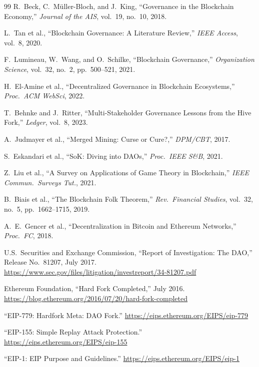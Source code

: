 \documentclass[sigconf,nonacm]{acmart}
\begin{document}
{\begin{thebibliography}{99}
R.~Beck, C.~Müller-Bloch, and J.~King, ``Governance in the Blockchain Economy,''
\emph{Journal of the AIS}, vol.~19, no.~10, 2018.

L.~Tan et al., ``Blockchain Governance: A Literature Review,'' \emph{IEEE Access},
vol.~8, 2020.

F.~Lumineau, W.~Wang, and O.~Schilke, ``Blockchain Governance,''
\emph{Organization Science}, vol.~32, no.~2, pp.~500--521, 2021.

H.~El-Amine et al., ``Decentralized Governance in Blockchain Ecosystems,''
\emph{Proc.\ ACM WebSci}, 2022.

T.~Behnke and J.~Ritter, ``Multi-Stakeholder Governance Lessons from the Hive Fork,''
\emph{Ledger}, vol.~8, 2023.

A.~Judmayer et al., ``Merged Mining: Curse or Cure?,'' \emph{DPM/CBT}, 2017.

S.~Eskandari et al., ``SoK: Diving into DAOs,'' \emph{Proc.\ IEEE S\&B}, 2021.

Z.~Liu et al., ``A Survey on Applications of Game Theory in Blockchain,''
\emph{IEEE Commun.\ Surveys Tut.}, 2021.

B.~Biais et al., ``The Blockchain Folk Theorem,'' \emph{Rev.\ Financial Studies},
vol.~32, no.~5, pp.~1662--1715, 2019.

A.~E.~Gencer et al., ``Decentralization in Bitcoin and Ethereum Networks,''
\emph{Proc.\ FC}, 2018.

U.S.\ Securities and Exchange Commission, ``Report of Investigation: The DAO,''
Release No.~81207, July 2017.
\url{https://www.sec.gov/files/litigation/investreport/34-81207.pdf}

Ethereum Foundation, ``Hard Fork Completed,'' July 2016.
\url{https://blog.ethereum.org/2016/07/20/hard-fork-completed}

``EIP-779: Hardfork Meta: DAO Fork.''
\url{https://eips.ethereum.org/EIPS/eip-779}

``EIP-155: Simple Replay Attack Protection.''
\url{https://eips.ethereum.org/EIPS/eip-155}

``EIP-1: EIP Purpose and Guidelines.''
\url{https://eips.ethereum.org/EIPS/eip-1}


\end{thebibliography}}
\end{document}

